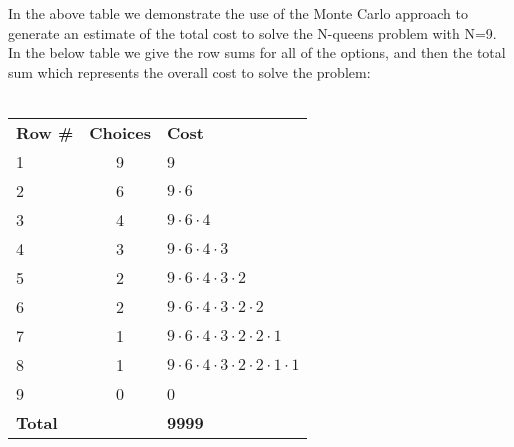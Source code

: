 In the above table we demonstrate the use of the Monte Carlo approach to generate an estimate of the total cost to solve the N-queens problem with N=9. In the below table we give the row sums for 
all of the options, and then the total sum which represents the overall cost to solve the problem:
\\
\\
\begin{centering}
\begin{tabular}{l | c | l}
	\textbf{Row \#} & \textbf{Choices} & \textbf{Cost} \\
	1 & 9 & 9 \\
	2 & 6 & $9 \cdot 6$ \\
	3 & 4 & $9 \cdot 6 \cdot 4$ \\
	4 & 3 & $9 \cdot 6 \cdot 4 \cdot 3$ \\
	5 & 2 & $9 \cdot 6 \cdot 4 \cdot 3 \cdot 2$ \\
	6 & 2 & $9 \cdot 6 \cdot 4 \cdot 3 \cdot 2 \cdot 2$ \\
	7 & 1 & $9 \cdot 6 \cdot 4 \cdot 3 \cdot 2 \cdot 2 \cdot 1$ \\
	8 & 1 & $9 \cdot 6 \cdot 4 \cdot 3 \cdot 2 \cdot 2 \cdot 1 \cdot 1$ \\
	9 & 0 & 0 \\
	\hline
	\textbf{Total} & & \textbf{9999}
\end{tabular}
\end{centering}